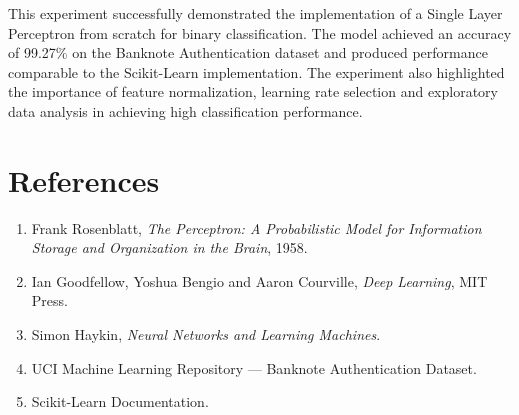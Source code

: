 \documentclass[12pt,a4paper]{article}
\begin{document}
This experiment successfully demonstrated the implementation of a Single Layer Perceptron from scratch for binary classification. The model achieved an accuracy of 99.27\% on the Banknote Authentication dataset and produced performance comparable to the Scikit-Learn implementation. The experiment also highlighted the importance of feature normalization, learning rate selection and exploratory data analysis in achieving high classification performance.


\section{References}

\begin{enumerate}

\item Frank Rosenblatt, \textit{The Perceptron: A Probabilistic Model for Information Storage and Organization in the Brain}, 1958.

\item Ian Goodfellow, Yoshua Bengio and Aaron Courville, \textit{Deep Learning}, MIT Press.

\item Simon Haykin, \textit{Neural Networks and Learning Machines}.

\item UCI Machine Learning Repository — Banknote Authentication Dataset.

\item Scikit-Learn Documentation.

\end{enumerate}
\end{document}
